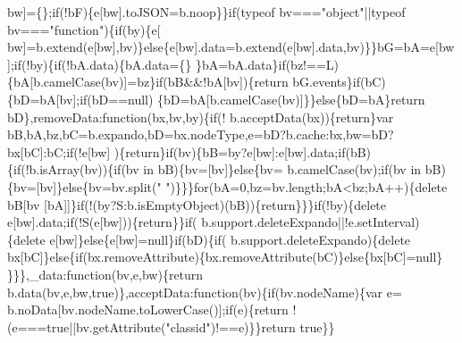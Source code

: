 \begin{DoxyCode}
      bw]=\{\};\textcolor{keywordflow}{if}(!bF)\{e[bw].toJSON=b.noop\}\}\textcolor{keywordflow}{if}(typeof bv===\textcolor{stringliteral}{"object"}||typeof bv===\textcolor{stringliteral}{"function"})\{\textcolor{keywordflow}{if}(by)\{e[
      bw]=b.extend(e[bw],bv)\}\textcolor{keywordflow}{else}\{e[bw].data=b.extend(e[bw].data,bv)\}\}bG=bA=e[bw];\textcolor{keywordflow}{if}(!by)\{\textcolor{keywordflow}{if}(!bA.data)\{bA.data=\{\}
      \}bA=bA.data\}\textcolor{keywordflow}{if}(bz!==L)\{bA[b.camelCase(bv)]=bz\}\textcolor{keywordflow}{if}(bB&&!bA[bv])\{\textcolor{keywordflow}{return} bG.events\}\textcolor{keywordflow}{if}(bC)\{bD=bA[bv];\textcolor{keywordflow}{if}(bD==null)
      \{bD=bA[b.camelCase(bv)]\}\}\textcolor{keywordflow}{else}\{bD=bA\}\textcolor{keywordflow}{return} bD\},removeData:\textcolor{keyword}{function}(bx,bv,by)\{\textcolor{keywordflow}{if}(!
      b.acceptData(bx))\{\textcolor{keywordflow}{return}\}var bB,bA,bz,bC=b.expando,bD=bx.nodeType,e=bD?b.cache:bx,bw=bD?bx[bC]:bC;\textcolor{keywordflow}{if}(!e[bw]
      )\{\textcolor{keywordflow}{return}\}\textcolor{keywordflow}{if}(bv)\{bB=by?e[bw]:e[bw].data;\textcolor{keywordflow}{if}(bB)\{\textcolor{keywordflow}{if}(!b.isArray(bv))\{\textcolor{keywordflow}{if}(bv in bB)\{bv=[bv]\}\textcolor{keywordflow}{else}\{bv=
      b.camelCase(bv);\textcolor{keywordflow}{if}(bv in bB)\{bv=[bv]\}\textcolor{keywordflow}{else}\{bv=bv.split(\textcolor{stringliteral}{" "})\}\}\}\textcolor{keywordflow}{for}(bA=0,bz=bv.length;bA<bz;bA++)\{\textcolor{keyword}{delete} bB[bv
      [bA]]\}\textcolor{keywordflow}{if}(!(by?S:b.isEmptyObject)(bB))\{\textcolor{keywordflow}{return}\}\}\}\textcolor{keywordflow}{if}(!by)\{\textcolor{keyword}{delete} e[bw].data;\textcolor{keywordflow}{if}(!S(e[bw]))\{\textcolor{keywordflow}{return}\}\}\textcolor{keywordflow}{if}(
      b.support.deleteExpando||!e.setInterval)\{\textcolor{keyword}{delete} e[bw]\}\textcolor{keywordflow}{else}\{e[bw]=null\}\textcolor{keywordflow}{if}(bD)\{\textcolor{keywordflow}{if}(
      b.support.deleteExpando)\{\textcolor{keyword}{delete} bx[bC]\}\textcolor{keywordflow}{else}\{\textcolor{keywordflow}{if}(bx.removeAttribute)\{bx.removeAttribute(bC)\}\textcolor{keywordflow}{else}\{bx[bC]=null\}
      \}\}\},\_data:\textcolor{keyword}{function}(bv,e,bw)\{\textcolor{keywordflow}{return} b.data(bv,e,bw,\textcolor{keyword}{true})\},acceptData:\textcolor{keyword}{function}(bv)\{\textcolor{keywordflow}{if}(bv.nodeName)\{var e=
      b.noData[bv.nodeName.toLowerCase()];\textcolor{keywordflow}{if}(e)\{\textcolor{keywordflow}{return} !(e===\textcolor{keyword}{true}||bv.getAttribute(\textcolor{stringliteral}{"classid"})!==e)\}\}\textcolor{keywordflow}{return} \textcolor{keyword}{true}\}\}

\end{DoxyCode}
